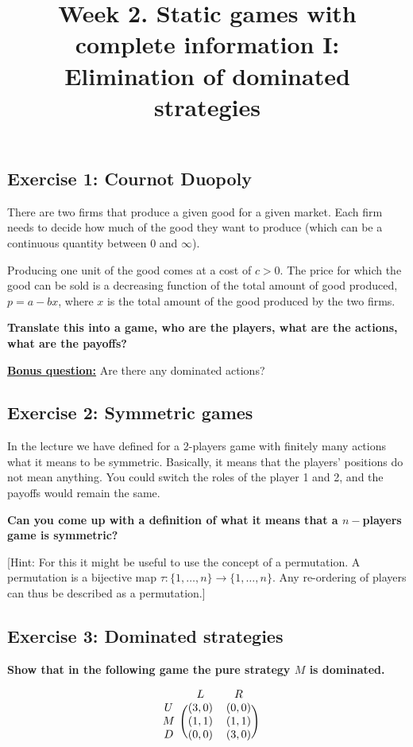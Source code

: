 \documentclass[10pt]{article}
\title{\textbf{Week 2.} Static games with complete information I: Elimination of dominated strategies}
\date{}
\begin{document}
\maketitle
\vspace{-1cm}

\subsection*{Exercise 1: Cournot Duopoly}
There are two firms that produce a given good for a given market. Each firm needs
to decide how much of the good they want to produce (which can be a continuous quantity between 0 and \(\infty\)).

Producing one unit of the good comes at a cost of \(c > 0\). The price for which the
good can be sold is a decreasing function of the total amount of good produced,
\(p = a - b x\), where \(x\) is the total amount of the good produced by the
two firms.

\textbf{Translate this into a game, who are the players, what are the actions, what are the payoffs?}

\underline{\textbf{Bonus question:}} Are there any dominated actions?


\subsection*{Exercise 2: Symmetric games}
In the lecture we have defined for a 2-players game with finitely many actions
what it means to be symmetric. Basically, it means that the players' positions do not
mean anything. You could switch the roles of the player 1 and 2, and the payoffs would
remain the same.

\textbf{Can you come up with a definition of what it means that a \(n-\)players game is symmetric?}

[Hint: For this it might be useful to use the concept of a permutation. A permutation
is a bijective map \(\tau: \{1, \dots, n\} \rightarrow \{1, \dots, n\}\). Any re-ordering
of players can thus be described as a permutation.]


\subsection*{Exercise 3: Dominated strategies}
\textbf{Show that in the following game the pure strategy \(M\) is dominated.}

\[
\begin{blockarray}{ccc}
& L & R \\
\begin{block}{c(cc)}
    U & (3, 0) & (0, 0) \\
    M & (1, 1) & (1, 1) \\
    D & (0, 0) & (3, 0) \\
\end{block}
\end{blockarray}
\]
\end{document}
